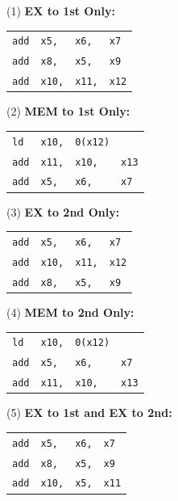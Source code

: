 \documentclass[addpoints]{exam}
\begin{document}
\begin{sloppypar}
\begin{questions}
\begin{parts}
\begin{solution}
            (1) \textbf{EX to 1st Only:} \\ 
            \hspace*{3mm} \begin{tabular}{l l l l}
                \texttt{add} & \texttt{x5,} & \texttt{x6,} & \texttt{x7} \\ 
                \texttt{add} & \texttt{x8,} & \texttt{x5,} & \texttt{x9} \\ 
                \texttt{add} & \texttt{x10,} & \texttt{x11,} & \texttt{x12}
            \end{tabular}

            (2) \textbf{MEM to 1st Only:} \\ 
            \hspace*{3mm} \begin{tabular}{l l l l}
                \texttt{ld} & \texttt{x10,} & \texttt{0(x12)} & \\ 
                \texttt{add} & \texttt{x11,} & \texttt{x10,} & \texttt{x13} \\ 
                \texttt{add} & \texttt{x5,} & \texttt{x6,} & \texttt{x7}
            \end{tabular}

            (3) \textbf{EX to 2nd Only:} \\ 
            \hspace*{3mm} \begin{tabular}{l l l l}
                \texttt{add} & \texttt{x5,} & \texttt{x6,} & \texttt{x7} \\ 
                \texttt{add} & \texttt{x10,} & \texttt{x11,} & \texttt{x12} \\ 
                \texttt{add} & \texttt{x8,} & \texttt{x5,} & \texttt{x9}
            \end{tabular}

            (4) \textbf{MEM to 2nd Only:} \\ 
            \hspace*{3mm} \begin{tabular}{l l l l}
                \texttt{ld} & \texttt{x10,} & \texttt{0(x12)} & \\ 
                \texttt{add} & \texttt{x5,} & \texttt{x6,} & \texttt{x7} \\ 
                \texttt{add} & \texttt{x11,} & \texttt{x10,} & \texttt{x13} 
            \end{tabular}

            (5) \textbf{EX to 1st and EX to 2nd:} \\ 
            \hspace*{3mm} \begin{tabular}{l l l l}
                \texttt{add} & \texttt{x5,} & \texttt{x6,} & \texttt{x7} \\ 
                \texttt{add} & \texttt{x8,} & \texttt{x5,} & \texttt{x9} \\ 
                \texttt{add} & \texttt{x10,} & \texttt{x5,} & \texttt{x11}
            \end{tabular}
        \end{solution}

\end{parts}
\end{questions}
\end{sloppypar}
\end{document}
